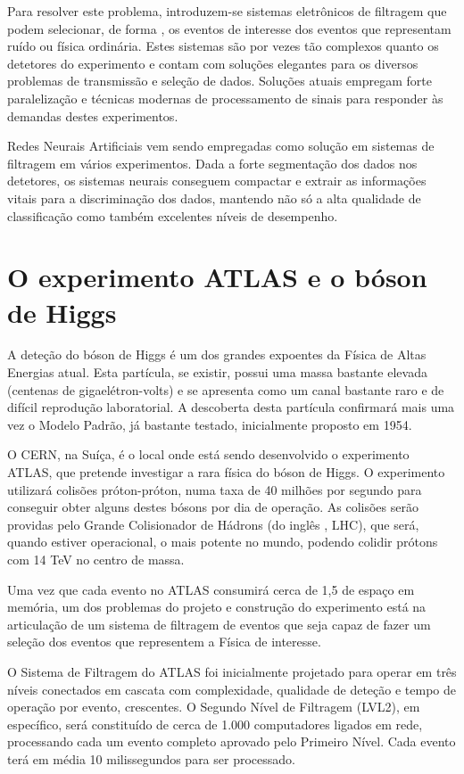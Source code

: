 Para resolver este problema, introduzem-se sistemas eletrônicos de filtragem
que podem selecionar, de forma , os eventos de interesse dos
eventos que representam ruído ou física ordinária. Estes sistemas são por
vezes tão complexos quanto os detetores do experimento e contam com soluções
elegantes para os diversos problemas de transmissão e seleção de
dados. Soluções atuais empregam forte paralelização e técnicas modernas de
processamento de sinais para responder às demandas destes experimentos.

Redes Neurais Artificiais vem sendo empregadas como solução em sistemas de
filtragem em vários experimentos. Dada a forte segmentação dos dados nos
detetores, os sistemas neurais conseguem compactar e extrair as informações
vitais para a discriminação dos dados, mantendo não só a alta qualidade de
classificação como também excelentes níveis de desempenho.

\section{O experimento ATLAS e o bóson de Higgs}

A deteção do bóson de Higgs é um dos grandes expoentes da Física de Altas
Energias atual. Esta partícula, se existir, possui uma massa bastante elevada
(centenas de gigaelétron-volts) e se apresenta como um canal bastante raro e
de difícil reprodução laboratorial. A descoberta desta partícula confirmará
mais uma vez o Modelo Padrão, já bastante testado, inicialmente proposto em
1954.

O CERN, na Suíça, é o local onde está sendo desenvolvido o experimento ATLAS,
que pretende investigar a rara física do bóson de Higgs. O experimento
utilizará colisões próton-próton, numa taxa de 40 milhões por segundo para
conseguir obter alguns destes bósons por dia de operação. As colisões serão
providas pelo Grande Colisionador de Hádrons (do inglês , LHC), que será, quando estiver operacional, o mais potente no
mundo, podendo colidir prótons com 14 TeV no centro de massa.

Uma vez que cada evento no ATLAS consumirá cerca de 1,5  de
espaço em memória, um dos problemas do projeto e construção do experimento
está na articulação de um sistema de filtragem de eventos que seja capaz de
fazer um seleção  dos eventos que representem a Física de
interesse.

O Sistema de Filtragem do ATLAS foi inicialmente projetado para operar em três
níveis conectados em cascata com complexidade, qualidade de deteção e tempo de
operação por evento, crescentes. O Segundo Nível de Filtragem (LVL2), em
específico, será constituído de cerca de 1.000 computadores ligados em rede,
processando cada um evento completo aprovado pelo Primeiro Nível. Cada evento
terá em média 10 milissegundos para ser processado.

